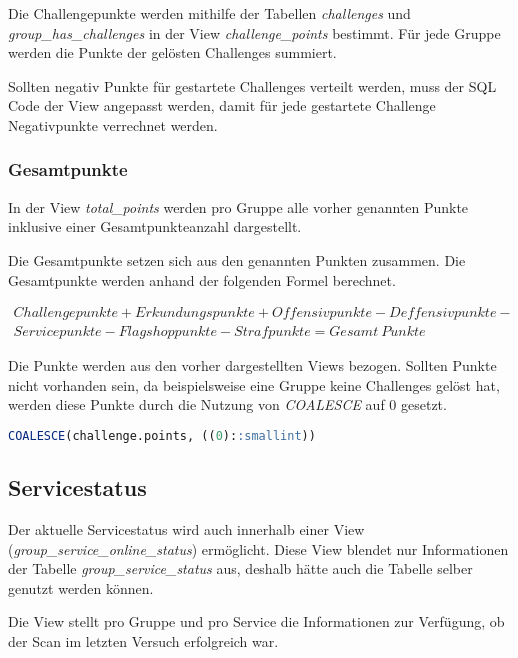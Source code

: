 Die Challengepunkte werden mithilfe der Tabellen \textit{challenges} und \textit{group\_has\_challenges} in der View \textit{challenge\_points} bestimmt. Für jede Gruppe werden die Punkte der gelösten Challenges summiert.

Sollten negativ Punkte für gestartete Challenges verteilt werden, muss der SQL Code der View angepasst werden, damit für jede gestartete Challenge Negativpunkte verrechnet werden. 

\subsubsection{Gesamtpunkte}
In der View \textit{total\_points} werden pro Gruppe alle vorher genannten Punkte inklusive einer Gesamtpunkteanzahl dargestellt. 

Die Gesamtpunkte setzen sich aus den genannten Punkten zusammen. Die Gesamtpunkte werden anhand der folgenden Formel berechnet.

\begin{multline*}
Challengepunkte + Erkundungspunkte + Offensivpunkte - Deffensivpunkte - \\ Servicepunkte - Flagshoppunkte - Strafpunkte = Gesamt~Punkte
\end{multline*}

Die Punkte werden aus den vorher dargestellten Views bezogen. Sollten Punkte nicht vorhanden sein, da beispielsweise eine Gruppe keine Challenges gelöst hat, werden diese Punkte durch die Nutzung von \textit{COALESCE} auf 0 gesetzt.

\begin{lstlisting}[frame=single, language=sql, caption={SQL Ersetzen nicht vorhandener Daten}, captionpos=b, label={lst:database-total-points-0}]
COALESCE(challenge.points, ((0)::smallint)) 
\end{lstlisting}

\subsection{Servicestatus}

Der aktuelle Servicestatus wird auch innerhalb einer View (\textit{group\_service\_online\_status}) ermöglicht. Diese View blendet nur Informationen der Tabelle \textit{group\_service\_status} aus, deshalb hätte auch die Tabelle selber genutzt werden können.

Die View stellt pro Gruppe und pro Service die Informationen zur Verfügung, ob der Scan im letzten Versuch erfolgreich war.